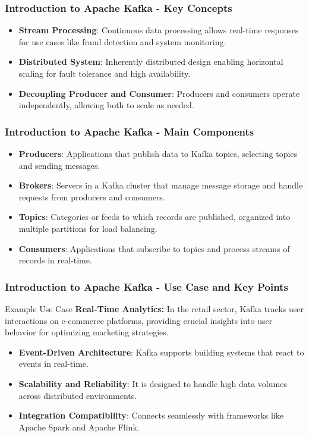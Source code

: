 \documentclass[aspectratio=169]{beamer}
\begin{document}
\begin{frame}[fragile]
    \frametitle{Introduction to Apache Kafka - Key Concepts}
    \begin{itemize}
        \item \textbf{Stream Processing}: Continuous data processing allows real-time responses for use cases like fraud detection and system monitoring.
        
        \item \textbf{Distributed System}: Inherently distributed design enabling horizontal scaling for fault tolerance and high availability.
        
        \item \textbf{Decoupling Producer and Consumer}: Producers and consumers operate independently, allowing both to scale as needed.
    \end{itemize}
\end{frame}

\begin{frame}[fragile]
    \frametitle{Introduction to Apache Kafka - Main Components}
    \begin{itemize}
        \item \textbf{Producers}: Applications that publish data to Kafka topics, selecting topics and sending messages.
        
        \item \textbf{Brokers}: Servers in a Kafka cluster that manage message storage and handle requests from producers and consumers.
        
        \item \textbf{Topics}: Categories or feeds to which records are published, organized into multiple partitions for load balancing.
        
        \item \textbf{Consumers}: Applications that subscribe to topics and process streams of records in real-time.
    \end{itemize}
\end{frame}

\begin{frame}[fragile]
    \frametitle{Introduction to Apache Kafka - Use Case and Key Points}
    \begin{block}{Example Use Case}
        \textbf{Real-Time Analytics:} In the retail sector, Kafka tracks user interactions on e-commerce platforms, providing crucial insights into user behavior for optimizing marketing strategies.
    \end{block}
    
    \begin{itemize}
        \item \textbf{Event-Driven Architecture}: Kafka supports building systems that react to events in real-time.
        \item \textbf{Scalability and Reliability}: It is designed to handle high data volumes across distributed environments.
        \item \textbf{Integration Compatibility}: Connects seamlessly with frameworks like Apache Spark and Apache Flink.
    \end{itemize}
\end{frame}
\end{document}
